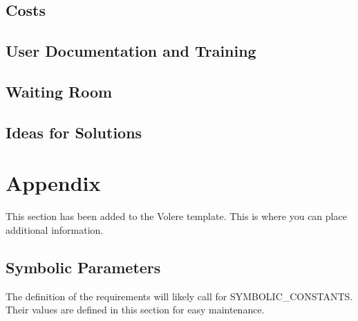 \documentclass[12pt, titlepage]{article}
\begin{document}
\subsection{Costs}

\subsection{User Documentation and Training}

\subsection{Waiting Room}

\subsection{Ideas for Solutions}





\newpage

\section{Appendix}

This section has been added to the Volere template.  This is where you can place
additional information.

\subsection{Symbolic Parameters}

The definition of the requirements will likely call for SYMBOLIC\_CONSTANTS.
Their values are defined in this section for easy maintenance.
\end{document}

